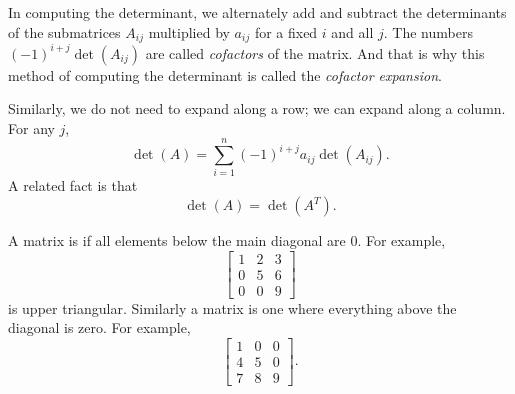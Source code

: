 In computing the determinant,
we alternately add and subtract the determinants of the submatrices
$A_{ij}$ multiplied by $a_{ij}$ for a fixed $i$ and all $j$.
The numbers ${(-1)}^{i+j}\det(A_{ij})$ are called
\emph{cofactors}
of the matrix.  And that is why
this method of computing the determinant is called the
\emph{cofactor expansion}.

Similarly, we do not need to expand along a row; we can expand
along a column.  For any $j$,
\begin{equation*}
\det (A)
=
\sum_{i=1}^n
{(-1)}^{i+j}
a_{ij} \det (A_{ij}) .
\end{equation*}
A related fact is that
\begin{equation*}
\det (A) = \det (A^T) .
\end{equation*}

\medskip

A matrix is \emph{} if all elements below
the main diagonal are 0.  For example,
\begin{equation*}
\begin{bmatrix}
1 & 2 & 3 \\
0 & 5 & 6 \\
0 & 0 & 9
\end{bmatrix}
\end{equation*}
is upper triangular.  Similarly a \emph{}
matrix is one where everything above the diagonal is zero.  For example,
\begin{equation*}
\begin{bmatrix}
1 & 0 & 0 \\
4 & 5 & 0 \\
7 & 8 & 9
\end{bmatrix} .
\end{equation*}

